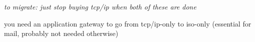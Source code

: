 \begin{bwslide}

\vspace{0.25in}
\end{bwslide}


\begin{note}\em
to migrate: just stop buying tcp/ip when both of these are done

you need an application gateway to go from tcp/ip-only to iso-only
(essential for mail, probably not needed otherwise)
\end{note}



